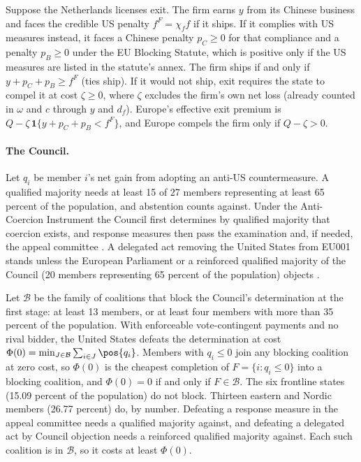\begin{remark}\label{rem:firm}
Suppose the Netherlands licenses exit. The firm earns $y$ from its Chinese business and faces the credible US penalty $f^F=\chi_f f$ if it ships. If it complies with US measures instead, it faces a Chinese penalty $p_C\ge0$ for that compliance and a penalty $p_B\ge0$ under the EU Blocking Statute, which is positive only if the US measures are listed in the statute's annex. The firm ships if and only if $y+p_C+p_B\ge f^F$ (ties ship). If it would not ship, exit requires the state to compel it at cost $\zeta\ge0$, where $\zeta$ excludes the firm's own net loss (already counted in $\omega$ and $c$ through $y$ and $d_f$). Europe's effective exit premium is $Q-\zeta\,\mathbf 1\{y+p_C+p_B<f^F\}$, and Europe compels the firm only if $Q-\zeta>0$.
\end{remark}

\paragraph{The Council.} Let $q_i$ be member $i$'s net gain from adopting an anti-US countermeasure. A qualified majority needs at least 15 of 27 members representing at least 65 percent of the population, and abstention counts against. Under the Anti-Coercion Instrument the Council first determines by qualified majority that coercion exists, and response measures then pass the examination and, if needed, the appeal committee \citep{eu2023aci, eu2011comitology}. A delegated act removing the United States from EU001 stands unless the European Parliament or a reinforced qualified majority of the Council (20 members representing 65 percent of the population) objects \citep{eu2021dualuse, eu2016tfeu}.

\begin{remark}\label{rem:council}
Let $\mathcal B$ be the family of coalitions that block the Council's determination at the first stage: at least 13 members, or at least four members with more than 35 percent of the population. With enforceable vote-contingent payments and no rival bidder, the United States defeats the determination at cost $\Phi(0)=\min_{J\in\mathcal B}\sum_{i\in J}\pos{q_i}$. Members with $q_i\le0$ join any blocking coalition at zero cost, so $\Phi(0)$ is the cheapest completion of $F=\{i:q_i\le0\}$ into a blocking coalition, and $\Phi(0)=0$ if and only if $F\in\mathcal B$. The six frontline states (15.09 percent of the population) do not block. Thirteen eastern and Nordic members (26.77 percent) do, by number. Defeating a response measure in the appeal committee needs a qualified majority against, and defeating a delegated act by Council objection needs a reinforced qualified majority against. Each such coalition is in $\mathcal B$, so it costs at least $\Phi(0)$.
\end{remark}

